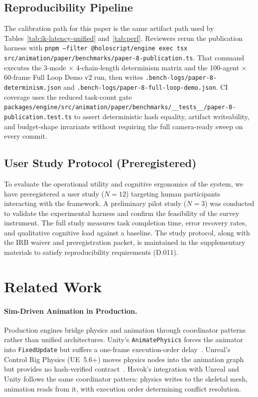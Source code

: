 \documentclass[sigconf,nonacm]{acmart}
\begin{document}
\subsection{Reproducibility Pipeline}
\label{sec:repro-pipeline}

The calibration path for this paper is the same artifact path used by
Tables~\ref{tab:ik-latency-unified} and~\ref{tab:perf}. Reviewers rerun the
publication harness with
\texttt{pnpm --filter @holoscript/engine exec tsx src/animation/paper/benchmarks/paper-8-publication.ts}.
That command executes the 3-mode $\times$ 4-chain-length determinism matrix
and the 100-agent $\times$ 60-frame Full Loop Demo v2 run, then writes
\texttt{.bench-logs/paper-8-determinism.json} and
\texttt{.bench-logs/paper-8-full-loop-demo.json}. CI coverage uses the reduced
task-count gate
\texttt{packages/engine/src/animation/paper/benchmarks/\_\_tests\_\_/paper-8-publication.test.ts}
to assert deterministic hash equality, artifact writeability, and budget-shape
invariants without requiring the full camera-ready sweep on every commit.


\subsection{User Study Protocol (Preregistered)}
\label{sec:user-study}

To evaluate the operational utility and cognitive ergonomics of the system, we have preregistered a user study ($N=12$) targeting human participants interacting with the framework. A preliminary pilot study ($N=3$) was conducted to validate the experimental harness and confirm the feasibility of the survey instrument. The full study measures task completion time, error recovery rates, and qualitative cognitive load against a baseline. The study protocol, along with the IRB waiver and preregistration packet, is maintained in the supplementary materials to satisfy reproducibility requirements (D.011).

\section{Related Work}
\label{sec:related}

\paragraph{Sim-Driven Animation in Production.}
Production engines bridge physics and animation through
coordinator patterns rather than unified architectures.
Unity's \texttt{AnimatePhysics} forces the animator into
\texttt{FixedUpdate} but suffers a one-frame execution-order
delay~\cite{unity-animatephysics-doc,unity-forum-animphys}.
Unreal's Control Rig Physics (UE~5.6+) moves physics nodes into
the animation graph but provides no hash-verified
contract~\cite{ue5-controlrig-physics}. Havok's integration
with Unreal and Unity follows the same coordinator pattern:
physics writes to the skeletal mesh, animation reads from it,
with execution order determining conflict resolution.
\end{document}
